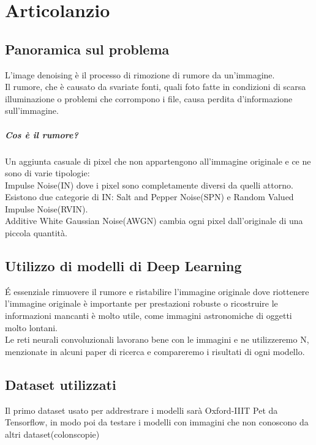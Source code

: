 \documentclass[12pt,a4paper,openright,twoside]{book}
\begin{document}
\titleformat{\chapter}{\normalfont\huge \bfseries}{\Huge \thechapter}{20pt}{\Huge}
\tableofcontents

\chapter{Articolanzio}
\section{Panoramica sul problema}
L'image denoising è il processo di rimozione di rumore da un'immagine.\\
Il rumore, che è causato da svariate fonti, quali foto fatte in condizioni di scarsa illuminazione o problemi che corrompono i file, causa perdita d'informazione sull'immagine.
\paragraph{Cos è il rumore?} 
Un aggiunta casuale di pixel che non appartengono all'immagine originale e ce ne sono di varie tipologie:\\
Impulse Noise(IN) dove i pixel sono completamente diversi da quelli attorno. Esistono due categorie di IN: Salt and Pepper Noise(SPN) e Random Valued Impulse Noise(RVIN).\\
Additive White Gaussian Noise(AWGN) cambia ogni pixel dall'originale di una piccola quantità.\\

\section{Utilizzo di modelli di Deep Learning}
\'E essenziale rimuovere il rumore e ristabilire l'immagine originale dove 
riottenere l'immagine originale è importante per prestazioni robuste o ricostruire le informazioni mancanti è molto utile, come immagini astronomiche di oggetti molto lontani.\\
Le reti neurali convoluzionali lavorano bene con le immagini e ne utilizzeremo N, menzionate in alcuni paper di ricerca e compareremo i risultati di ogni modello.\\

\section{Dataset utilizzati}
Il primo dataset usato per addrestrare i modelli sarà Oxford-IIIT Pet da Tensorflow, in modo poi da testare i modelli con immagini che non conoscono da altri dataset(colonscopie)
\end{document}
